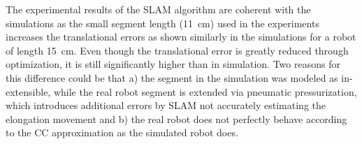 The experimental results of the \gls{SLAM} algorithm are coherent with the simulations as the small segment length (\SI{11}{cm}) used in the experiments increases the translational errors as shown similarly in the simulations for a robot of length \SI{15}{cm}.
Even though the translational error is greatly reduced through optimization, it is still significantly higher than in simulation. Two reasons for this difference could be that a) the segment in the simulation was modeled as in-extensible, while the real robot segment is extended via pneumatic pressurization, which introduces additional errors by \gls{SLAM} not accurately estimating the elongation movement and b) the real robot does not perfectly behave according to the \gls{CC} approximation as the simulated robot does.


